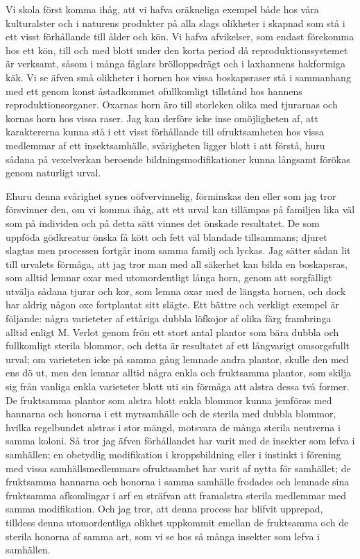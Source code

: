 Vi skola först komma ihåg, att vi hafva oräkneliga exempel både hos våra kulturalster och i naturens produkter på alla slags olikheter i skapnad som stå i ett visst förhållande till ålder och kön. Vi hafva afvikelser, som endast förekomma hos ett kön, till och med blott under den korta period då reproduktionssystemet är verksamt, såsom i många fåglars brölloppsdrägt och i laxhannens hakformiga käk. Vi se äfven små olikheter i hornen hos vissa boskapsraser stå i sammanhang med ett genom konst åstadkommet ofullkomligt tillstånd hos hannens reproduktionsorganer. Oxarnas horn äro till storleken olika med tjurarnas och kornas horn hos vissa raser. Jag kan derföre icke inse omöjligheten af, att karaktererna kunna stå i ett visst förhållande till ofruktsamheten hos vissa medlemmar af ett insektsamhälle, svårigheten ligger blott i att förstå, huru sådana på vexelverkan beroende bildningsmodifikationer kunna långsamt förökas genom naturligt urval.

Ehuru denna svårighet synes oöfvervinnelig, förminskas den eller som jag tror försvinner den, om vi komma ihåg, att ett urval kan tillämpas på familjen lika väl som på individen och på detta sätt vinnes det önskade resultatet. De som uppföda gödkreatur önska få kött och fett väl blandade tillsammans; djuret slagtas men processen fortgår inom samma familj och lyckas. Jag sätter sådan lit till urvalets förmåga, att jag tror man med all säkerhet kan bilda en boskapsras, som alltid lemnar oxar med utomordentligt långa horn, genom att sorgfälligt utvälja sådana tjurar och kor, som lemna oxar med de längsta hornen, och dock har aldrig någon oxe fortplantat sitt slägte. Ett bättre och verkligt exempel är följande: några varieteter af ettåriga dubbla löfkojor af olika färg frambringa alltid enligt M. Verlot genom frön ett stort antal plantor som bära dubbla och fullkomligt sterila blommor, och detta är resultatet af ett långvarigt omsorgsfullt urval; om varieteten icke på samma gång lemnade andra plantor, skulle den med ens dö ut, men den lemnar alltid några enkla och fruktsamma plantor, som skilja sig från vanliga enkla varieteter blott uti sin förmåga att alstra dessa två former. De fruktsamma plantor som alstra blott enkla blommor kunna jemföras med hannarna och honorna i ett myrsamhälle och de sterila med dubbla blommor, hvilka regelbundet alstras i stor mängd, motsvara de många sterila neutrerna i samma koloni. Så tror jag äfven förhållandet har varit med de insekter som lefva i samhällen; en obetydlig modifikation i kroppsbildning eller i instinkt i förening med vissa samhällsmedlemmars ofruktsamhet har varit af nytta för samhället; de fruktsamma hannarna och honorna i samma samhälle frodades och lemnade sina fruktsamma afkomlingar i arf en sträfvan att framalstra sterila medlemmar med samma modifikation. Och jag tror, att denna process har blifvit upprepad, tilldess denna utomordentliga olikhet uppkommit emellan de fruktsamma och de sterila honorna af samma art, som vi se hos så många insekter som lefva i samhällen.

